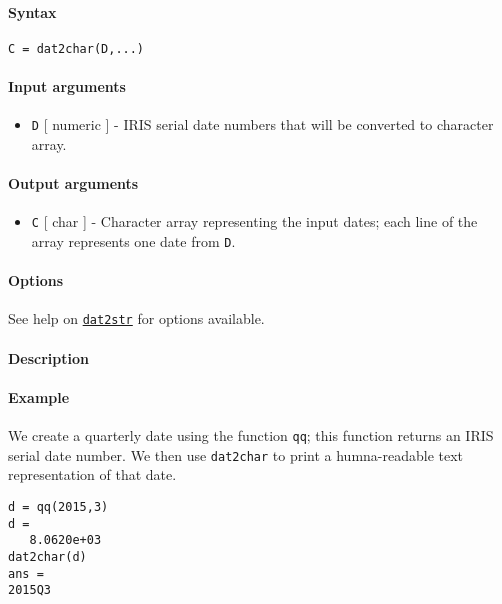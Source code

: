 


	\paragraph{Syntax}\label{syntax}

\begin{verbatim}
C = dat2char(D,...)
\end{verbatim}

\paragraph{Input arguments}\label{input-arguments}

\begin{itemize}
\itemsep1pt\parskip0pt
\item
  \texttt{D} {[} numeric {]} - IRIS serial date numbers that will be
  converted to character array.
\end{itemize}

\paragraph{Output arguments}\label{output-arguments}

\begin{itemize}
\itemsep1pt\parskip0pt
\item
  \texttt{C} {[} char {]} - Character array representing the input
  dates; each line of the array represents one date from \texttt{D}.
\end{itemize}

\paragraph{Options}\label{options}

See help on \href{dates/dat2str}{\texttt{dat2str}} for options
available.

\paragraph{Description}\label{description}

\paragraph{Example}\label{example}

We create a quarterly date using the function \texttt{qq}; this function
returns an IRIS serial date number. We then use \texttt{dat2char} to
print a humna-readable text representation of that date.

\begin{verbatim}
d = qq(2015,3)
d =
   8.0620e+03
dat2char(d)
ans =
2015Q3
\end{verbatim}



